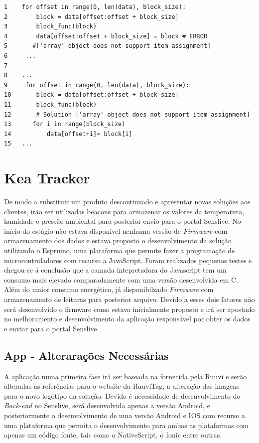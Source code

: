 \begin{verbatim}
1    for offset in range(0, len(data), block_size):
2        block = data[offset:offset + block_size]
3        block_func(block)
4        data[offset:offset + block_size] = block # ERROR 
5       #['array' object does not support item assignment]
6     ...
7
8    ...
9     for offset in range(0, len(data), block_size):
10       block = data[offset:offset + block_size]
11       block_func(block)
12       # Solution ['array' object does not support item assignment]
13      for i in range(block_size)
14          data[offset+i]= block[i]
15   ...
 \end{verbatim}

\section {Kea Tracker}

\par De modo a substituir um produto descontinuado e apresentar novas soluções aos clientes, irão ser utilizadas beacons para armazenar os valores da temperatura, humidade e pressão ambiental para posterior envio para o portal Senslive. No início do estágio não estava disponivel nenhuma versão de \textit{Firmware} com armazenamento dos dados e estava proposto o desenvolvimento da solução utilizando o Espruino, uma plataforma que permite fazer a programação de microcontroladores com recurso a JavaScript. Foram realizados pequenos testes e chegou-se á conclusão que a camada intepretadora do Javascript tem um consumo mais elevado comparadamente com uma versão desenvolvida em C. Além do maior consumo energético, já disponibilzado \textit{Firmware} com armazenamento de leituras para posterior arquivo. Devido a esses dois fatores não será desenvolvido o firmware como estava inicialmente proposto e irá ser apostado no melhoramento e desenvolvimento da aplicação responsável por obter os dados e enviar para o portal Senslive. 

\subsection{App - Alterarações Necessárias}

\par A aplicação numa primeira fase irá ser baseada na fornecida pela Ruuvi e serão alteradas as referências para o website da RuuviTag, a alteração das imagens para o novo logótipo da solução. Devido é necessidade de desenvolvimento do \textit{Back-end} no Senslive, será desenvolvida apenas a versão Android, e posteriormente o desenvolvimento de uma versão Android e IOS com recurso a uma plataforma que permita o desenvolvimento para ambas as plataformas com apenas um código fonte, tais como o NativeScript\cite{nativescript}, o Ionic\cite{ionic} entre outras.

